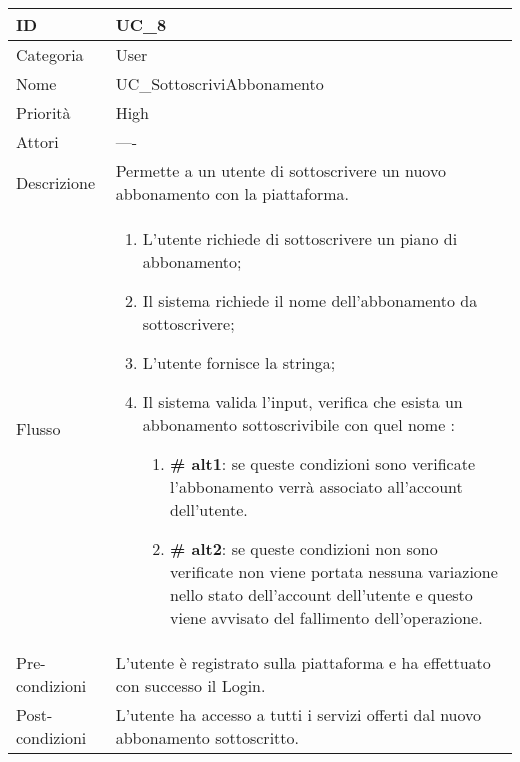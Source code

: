 \begin{center}
\begin{tabular}{ |p{2cm}|p{13cm}|  }
\hline
ID & UC\_8 \\\hline
Categoria & User\\\hline
Nome & UC\_SottoscriviAbbonamento\\\hline
Priorità & High \\\hline
Attori &  ---- \\\hline
Descrizione & Permette a un utente di sottoscrivere un nuovo abbonamento con la piattaforma.\\\hline
Flusso &  	\begin{enumerate}
			\item L'utente richiede di sottoscrivere un piano di abbonamento;
			\item Il sistema richiede il nome dell'abbonamento da sottoscrivere;
			\item L'utente fornisce la stringa;
			\item Il sistema valida l'input, verifica che esista un abbonamento sottoscrivibile con quel nome :
			\begin{enumerate}[  ]
				\item \textbf{\# alt1}: se queste condizioni sono verificate l'abbonamento verrà associato all'account dell'utente.
				\item \textbf{\# alt2}: se queste condizioni non sono verificate non viene portata nessuna variazione nello stato dell'account dell'utente e questo viene avvisato del fallimento dell'operazione.
			\end{enumerate}
		\end{enumerate}\\\hline
Pre-condizioni & L'utente è registrato sulla piattaforma e ha effettuato con successo il Login.\\\hline
Post-condizioni &  L'utente ha accesso a tutti i servizi offerti dal nuovo abbonamento sottoscritto.\\\hline
\end{tabular}
\label{table_use_case:8}\newline


\end{center}
